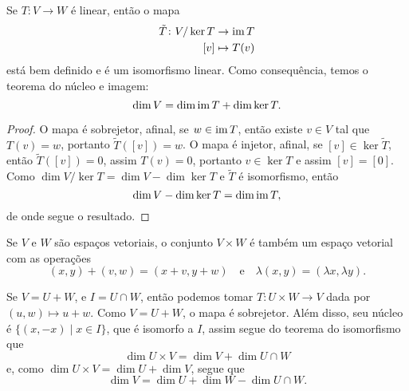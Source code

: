 \begin{theorem}
    Se $T \colon V \to W$ é linear, então o mapa \begin{equation}
        \begin{split}
            \tilde{T} \colon V/\ker T &\to \operatorname{im} T \\ [v] &\mapsto T(v)
        \end{split}
    \end{equation} está bem definido e é um isomorfismo linear. Como consequência, temos o teorema do núcleo e imagem: \begin{equation*}
        \dim V = \dim \operatorname{im} T + \dim \ker T.
    \end{equation*}
\end{theorem}
\begin{proof}
    O mapa é sobrejetor, afinal, se $w \in \operatorname{im} T$, então existe $v \in V$ tal que $T(v) = w$, portanto $\tilde{T}([v]) = w$. O mapa é injetor, afinal, se $[v] \in \ker \tilde{T}$, então $\tilde{T}([v]) = 0$, assim $T(v) = 0$, portanto $v \in \ker T$ e assim $[v] = [0]$. Como $\dim V/\ker T = \dim V - \dim \ker T$ e $\tilde{T}$ é isomorfismo, então \begin{equation}
        \dim V - \dim \ker T = \dim \operatorname{im} T,
    \end{equation} de onde segue o resultado.
\end{proof}

Se $V$ e $W$ são espaços vetoriais, o conjunto $V \times W$ é também um espaço vetorial com as operações \begin{equation}
    (x,y) + (v,w) = (x+v, y+w) \quad \text{e} \quad \lambda(x,y) = (\lambda x, \lambda y).
\end{equation}

Se $V = U + W$, e $I = U \cap W$, então podemos tomar $T \colon U \times W \to V$ dada por $(u,w) \mapsto u+w$. Como $V = U + W$, o mapa é sobrejetor. Além disso, seu núcleo é $\{(x,-x) \mid x \in I\}$, que é isomorfo a $I$, assim segue do teorema do isomorfismo que \begin{equation}
    \dim U \times V = \dim V + \dim U \cap W
\end{equation} e, como $\dim U \times V = \dim U + \dim V$, segue que \begin{equation}
    \dim V = \dim U + \dim W - \dim U \cap W.
\end{equation}

